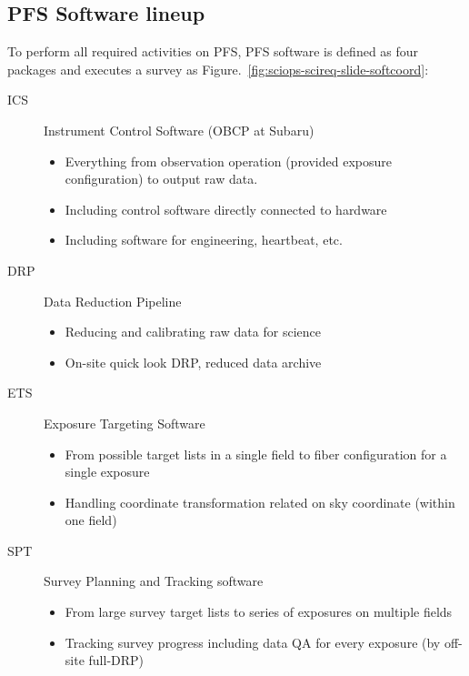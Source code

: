 \documentclass[a4paper,notitlepage]{article}
\begin{document}
\subsection{PFS Software lineup}

To perform all required activities on PFS, PFS software is defined as
four packages and executes a survey as
Figure.~\ref{fig:sciops-scireq-slide-softcoord}:
\begin{description}
 \item[ICS] Instrument Control Software (OBCP at Subaru)
	    \begin{itemize}
	     \item Everything from observation operation (provided exposure
		   configuration) to output raw data.
	     \item Including control software directly connected to hardware
	     \item Including software for engineering, heartbeat, etc.
	    \end{itemize}
 \item[DRP] Data Reduction Pipeline
	    \begin{itemize}
	     \item Reducing and calibrating raw data for science
	     \item On-site quick look DRP, reduced data archive
	    \end{itemize}
 \item[ETS] Exposure Targeting Software
	    \begin{itemize}
	     \item From possible target lists in a single field to fiber
		   configuration for a single exposure
	     \item Handling coordinate transformation related on sky coordinate
		   (within one field)
	    \end{itemize}
 \item[SPT] Survey Planning and Tracking software
	    \begin{itemize}
	     \item From large survey target lists to series of exposures on
		   multiple fields
	     \item Tracking survey progress including data QA for every
		   exposure (by off-site full-DRP)
	    \end{itemize}
\end{description}
\end{document}
